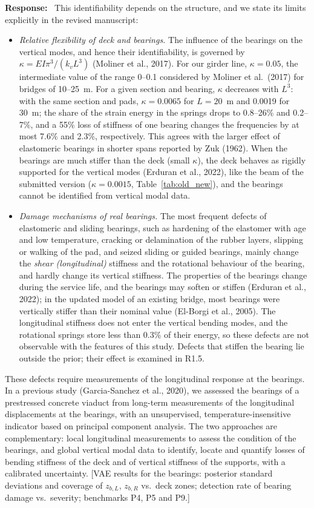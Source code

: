 \documentclass[11pt]{article}
\newenvironment{response}{\par\smallskip\noindent\color{resp}\textbf{Response:}\ }{\par}
\newcommand{\tbd}[1]{\textcolor{note}{\textsf{[#1]}}}
\begin{document}
\begin{response}
This identifiability depends on the structure, and we state its limits explicitly in the revised manuscript:
\begin{itemize}[leftmargin=*]
\item \emph{Relative flexibility of deck and bearings.} The influence of the bearings on the vertical modes, and hence
their identifiability, is governed by $\kappa=EI\pi^3/(k_vL^3)$ (Moliner et al., 2017). For our girder line,
$\kappa=0.05$, the intermediate value of the range 0--0.1 considered by Moliner et al.\ (2017) for bridges of 10--25~m.
For a given section and bearing, $\kappa$ decreases with $L^3$: with the same section and pads, $\kappa=0.0065$ for
$L=20$~m and 0.0019 for 30~m; the share of the strain energy in the springs drops to 0.8--26\% and 0.2--7\%, and a 55\%
loss of stiffness of one bearing changes the frequencies by at most 7.6\% and 2.3\%, respectively. This agrees with the
larger effect of elastomeric bearings in shorter spans reported by Zuk (1962). When the bearings are much stiffer than
the deck (small $\kappa$), the deck behaves as rigidly supported for the vertical modes (Erduran et al., 2022), like the
beam of the submitted version ($\kappa=0.0015$, Table~\ref{tab:old_new}), and the bearings cannot be identified from
vertical modal data.
\item \emph{Damage mechanisms of real bearings.} The most frequent defects of elastomeric and sliding bearings, such as
hardening of the elastomer with age and low temperature, cracking or delamination of the rubber layers, slipping or
walking of the pad, and seized sliding or guided bearings, mainly change the \emph{shear (longitudinal)} stiffness and the
rotational behaviour of the bearing, and hardly change its vertical stiffness. The properties of the bearings change
during the service life, and the bearings may soften or stiffen (Erduran et al., 2022); in the updated model of an
existing bridge, most bearings were vertically stiffer than their nominal value (El-Borgi et al., 2005). The
longitudinal stiffness does not enter
the vertical bending modes, and the rotational springs store less than 0.3\% of their energy, so these defects are not
observable with the features of this study. Defects that stiffen the bearing lie outside the prior; their effect is
examined in R1.5.
\end{itemize}
These defects require measurements of the longitudinal response at the bearings. In a previous study
(Garcia-Sanchez et al., 2020), we assessed the bearings of a prestressed concrete viaduct from long-term measurements of
the longitudinal displacements at the bearings, with an unsupervised, temperature-insensitive indicator based on
principal component analysis. The two approaches are complementary: local longitudinal measurements to assess the
condition of the bearings, and global vertical modal data to identify, locate and quantify losses of bending stiffness
of the deck and of vertical stiffness of the supports, with a calibrated uncertainty.
\tbd{VAE results for the bearings: posterior standard deviations and coverage of $z_{b,L}$, $z_{b,R}$ vs.\ deck zones;
detection rate of bearing damage vs.\ severity; benchmarks P4, P5 and P9.}


\end{response}
\end{document}

